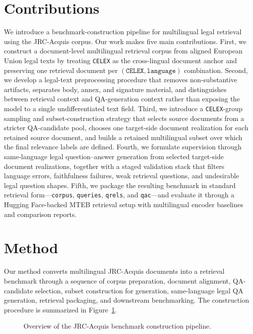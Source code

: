 \section{Contributions}

We introduce a benchmark-construction pipeline for multilingual legal retrieval using the JRC-Acquis corpus. Our work makes five main contributions. First, we construct a document-level multilingual retrieval corpus from aligned European Union legal texts by treating \texttt{CELEX} as the cross-lingual document anchor and preserving one retrieval document per \((\texttt{CELEX}, \texttt{language})\) combination. Second, we develop a legal-text preprocessing procedure that removes non-substantive artifacts, separates body, annex, and signature material, and distinguishes between retrieval context and QA-generation context rather than exposing the model to a single undifferentiated text field. Third, we introduce a \texttt{CELEX}-group sampling and subset-construction strategy that selects source documents from a stricter QA-candidate pool, chooses one target-side document realization for each retained source document, and builds a retained multilingual subset over which the final relevance labels are defined. Fourth, we formulate supervision through same-language legal question--answer generation from selected target-side document realizations, together with a staged validation stack that filters language errors, faithfulness failures, weak retrieval questions, and undesirable legal question shapes. Fifth, we package the resulting benchmark in standard retrieval form---\texttt{corpus}, \texttt{queries}, \texttt{qrels}, and \texttt{qac}---and evaluate it through a Hugging Face-backed MTEB retrieval setup with multilingual encoder baselines and comparison reports.

\section{Method}

Our method converts multilingual JRC-Acquis documents into a retrieval benchmark through a sequence of corpus preparation, document alignment, QA-candidate selection, subset construction for generation, same-language legal QA generation, retrieval packaging, and downstream benchmarking. The construction procedure is summarized in Figure~\ref{fig:jrc-method-overview}.

\begin{figure}[t]
\centering
{}
\caption{Overview of the JRC-Acquis benchmark construction pipeline.}
\label{fig:jrc-method-overview}
\end{figure}

